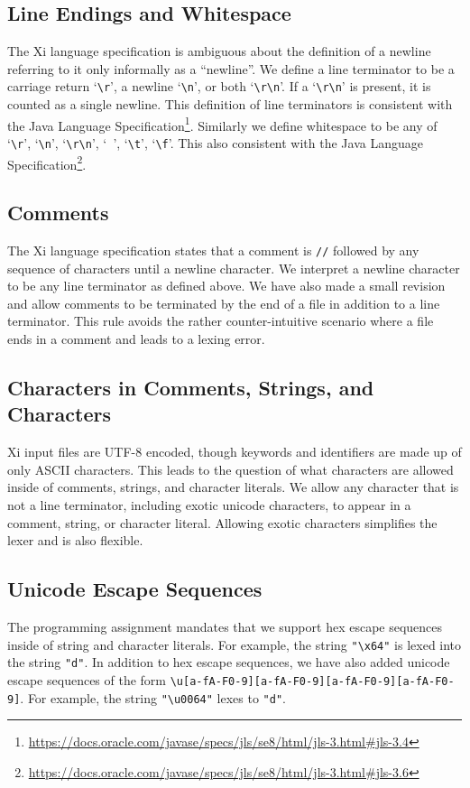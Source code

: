 \documentclass{hw}
\begin{document}
\subsection{Line Endings and Whitespace}
The Xi language specification is ambiguous about the definition of a newline
referring to it only informally as a ``newline''. We define a line terminator
to be a carriage return `\verb$\r$', a newline `\verb$\n$', or both
`\verb$\r\n$'. If a `\verb$\r\n$' is present, it is counted as a single
newline. This definition of line terminators is consistent with the Java
Language
Specification\footnote{\url{https://docs.oracle.com/javase/specs/jls/se8/html/jls-3.html\#jls-3.4}}.
Similarly we define whitespace to be any of `\verb$\r$', `\verb$\n$',
`\verb$\r\n$', `\verb$ $', `\verb$\t$', `\verb$\f$'. This also consistent with
the Java Language
Specification\footnote{\url{https://docs.oracle.com/javase/specs/jls/se8/html/jls-3.html\#jls-3.6}}.

\subsection{Comments}
The Xi language specification states that a comment is \texttt{//} followed by
any sequence of characters until a newline character. We interpret a newline
character to be any line terminator as defined above. We have also made a small
revision and allow comments to be terminated by the end of a file in addition
to a line terminator. This rule avoids the rather counter-intuitive scenario
where a file ends in a comment and leads to a lexing error.

\subsection{Characters in Comments, Strings, and Characters}
Xi input files are UTF-8 encoded, though keywords and identifiers are made up
of only ASCII characters. This leads to the question of what characters are
allowed inside of comments, strings, and character literals. We allow any
character that is not a line terminator, including exotic unicode characters,
to appear in a comment, string, or character literal. Allowing exotic
characters simplifies the lexer and is also flexible.

\subsection{Unicode Escape Sequences}
The programming assignment mandates that we support hex escape sequences inside
of string and character literals. For example, the string \verb$"\x64"$ is
lexed into the string \texttt{"d"}. In addition to hex escape sequences, we
have also added unicode escape sequences of the form
\verb$\u[a-fA-F0-9][a-fA-F0-9][a-fA-F0-9][a-fA-F0-9]$. For example, the string
\verb$"\u0064"$ lexes to \texttt{"d"}.
\end{document}
